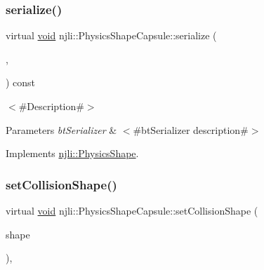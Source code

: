 \mbox{\label{classnjli_1_1_physics_shape_capsule_a48a70d364b231ba98de91dd53af33ed3}} 
\subsubsection{\texorpdfstring{serialize()}{serialize()}}
{\footnotesize\ttfamily virtual \mbox{\hyperlink{_thread_8h_af1e856da2e658414cb2456cb6f7ebc66}{void}} njli\+::\+Physics\+Shape\+Capsule\+::serialize (\begin{DoxyParamCaption}\item[{\mbox{\hyperlink{_thread_8h_af1e856da2e658414cb2456cb6f7ebc66}{void}} $\ast$}]{,  }\item[{bt\+Serializer $\ast$}]{ }\end{DoxyParamCaption}) const\hspace{0.3cm}{\ttfamily [virtual]}}

$<$\#\+Description\#$>$


\begin{DoxyParams}{Parameters}
{\em bt\+Serializer} & $<$\#bt\+Serializer description\#$>$ \\
\hline
\end{DoxyParams}


Implements \mbox{\hyperlink{classnjli_1_1_physics_shape_a2ac8a109a5ad67ee79f40ce8f28337cf}{njli\+::\+Physics\+Shape}}.

\mbox{\label{classnjli_1_1_physics_shape_capsule_a8f520536b574f254ba6635ab2fe644cc}} 
\subsubsection{\texorpdfstring{set\+Collision\+Shape()}{setCollisionShape()}}
{\footnotesize\ttfamily virtual \mbox{\hyperlink{_thread_8h_af1e856da2e658414cb2456cb6f7ebc66}{void}} njli\+::\+Physics\+Shape\+Capsule\+::set\+Collision\+Shape (\begin{DoxyParamCaption}\item[{const bt\+Collision\+Shape \&}]{shape }\end{DoxyParamCaption})\hspace{0.3cm}{\ttfamily [protected]}, {\ttfamily [virtual]}}



